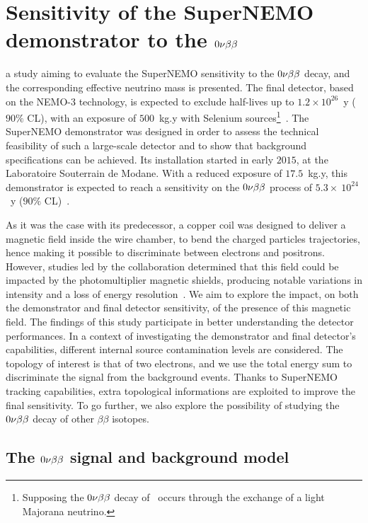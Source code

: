 \chapter{Sensitivity of the SuperNEMO demonstrator to the $0\nu\beta\beta$}
\label{ch:sensitivity}

a study aiming to evaluate the SuperNEMO sensitivity to the $0\nu\beta\beta$ decay, and the corresponding effective neutrino mass is presented.
The final detector, based on the NEMO-$3$ technology, is expected to exclude half-lives up to $1.2\times 10^{26}$~y ($90\%$ CL), with an exposure of $500$~kg.y with Selenium sources\footnote{Supposing the $0\nu\beta\beta$ decay of \Se\ occurs through the exchange of a light Majorana neutrino.}~\cite{art:SuperNEMO2010}.
The SuperNEMO demonstrator was designed in order to assess the technical feasibility of such a large-scale detector and to show that background specifications can be achieved.
Its installation started in early $2015$, at the Laboratoire Souterrain de Modane.
With a reduced exposure of $17.5$~kg.y, this demonstrator is expected to reach a sensitivity on the $0\nu\beta\beta$ process of $5.3\times~10^{24}$~y ($90\%$ CL)~\cite{CalvezThesis}.

As it was the case with its predecessor, a copper coil was designed to deliver a magnetic field inside the wire chamber, to bend the charged particles trajectories, hence making it possible to discriminate between electrons and positrons.
However, studies led by the collaboration determined that this field could be impacted by the photomultiplier magnetic shields, producing notable variations in intensity and a loss of energy resolution~\cite{CalvezThesis}\cite{internal:magnetic_field}.
We aim to explore the impact, on both the demonstrator and final detector sensitivity, of the presence of this magnetic field.
The findings of this study participate in better understanding the detector performances.
In a context of investigating the demonstrator and final detector's capabilities, different internal source contamination levels are considered.
The topology of interest is that of two electrons, and we use the total energy sum to discriminate the signal from the background events.
Thanks to SuperNEMO tracking capabilities, extra topological informations are exploited to improve the final sensitivity.
To go further, we also explore the possibility of studying the $0\nu\beta\beta$ decay of other $\beta\beta$ isotopes.

\section{The $0\nu\beta\beta$ signal and background model}
\label{sec:sensitivity_simus}

